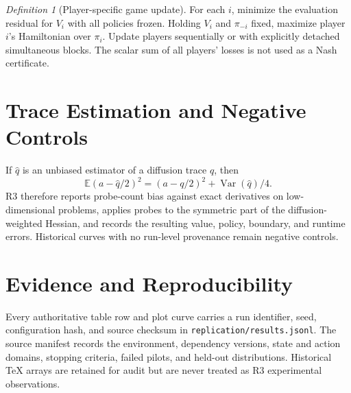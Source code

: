\documentclass[ecta]{econsocart}
\theoremstyle{plain}
\theoremstyle{remark}
\newtheorem{definition}{Definition}
\newcommand{\E}{\mathbb{E}}
\begin{document}
\begin{definition}[Player-specific game update]
For each $i$, minimize the evaluation residual for $V_i$ with all policies frozen. Holding $V_i$ and $\pi_{-i}$ fixed, maximize player $i$'s Hamiltonian over $\pi_i$. Update players sequentially or with explicitly detached simultaneous blocks. The scalar sum of all players' losses is not used as a Nash certificate.
\end{definition}

\section{Trace Estimation and Negative Controls}
If $\widehat q$ is an unbiased estimator of a diffusion trace $q$, then
\[
\E(a-\widehat q/2)^2=(a-q/2)^2+\operatorname{Var}(\widehat q)/4.
\]
R3 therefore reports probe-count bias against exact derivatives on low-dimensional problems, applies probes to the symmetric part of the diffusion-weighted Hessian, and records the resulting value, policy, boundary, and runtime errors. Historical curves with no run-level provenance remain negative controls.

\section{Evidence and Reproducibility}
Every authoritative table row and plot curve carries a run identifier, seed, configuration hash, and source checksum in \texttt{replication/results.jsonl}. The source manifest records the environment, dependency versions, state and action domains, stopping criteria, failed pilots, and held-out distributions. Historical TeX arrays are retained for audit but are never treated as R3 experimental observations.
\end{document}
